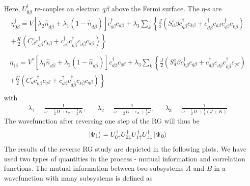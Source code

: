 \documentclass[twoside,11pt]{report}
\numberwithin{equation}{section}
\begin{document}
Here, \(U^\dagger_{0\beta}\) re-couples an electron \(q\beta\) above the Fermi surface. The \(\eta\)-s are
\begin{equation}\begin{aligned}
	\eta_{0\beta}^\dagger = V \left[\lambda_2 \hat n_{d\overline\beta} + \lambda_1 \left( 1 - \hat n_{d\overline\beta} \right)  \right]c^\dagger_{q\beta}c_{d\beta} + \lambda_3 \sum_{k} \left\{ \frac{J}{2}\left( S_d^z \beta c^\dagger_{q\beta}c_{k\beta} + c^\dagger_{d\overline\beta}c_{d\beta}c^\dagger_{q\beta}c_{k\overline\beta}\right) \right.\\
	+ \left.\frac{K}{2}\left( C^z_d c^\dagger_{q\beta}c_{k\beta} + c^\dagger_{q\beta}c^\dagger_{k\overline\beta}c_{d\overline\beta}c_{d\beta} \right) \right\} \\
\end{aligned}\end{equation}
\begin{equation}\begin{aligned}
	\eta_{1\beta} = V^* \left[\lambda_1 \hat n_{d\overline\beta} + \lambda_2 \left( 1 - \hat n_{d\overline\beta} \right)  \right]c^\dagger_{d\beta}c_{q\beta} + \lambda_3 \sum_{k} \left\{ \frac{J}{2}\left( S_d^z \beta c^\dagger_{k\beta}c_{q\beta} + c^\dagger_{d\beta}c_{d\overline\beta}c^\dagger_{k\overline\beta}c_{q\beta}\right) \right.\\
	+ \left.\frac{K}{2}\left( C^z_d c^\dagger_{k\beta}c_{q\beta} + c^\dagger_{d\beta}c^\dagger_{d\overline\beta}c_{k\overline\beta}c_{q\beta} \right) \right\} \\
\end{aligned}\end{equation}
with
\begin{equation}\begin{aligned}
	\lambda_1 = \frac{1}{\omega - \frac{1}{2}D + \epsilon_d + \frac{1}{2}K}, && \lambda_2 = \frac{1}{\omega - \frac{1}{2}D - \epsilon_d + \frac{1}{2}J}, && \lambda_3 = \frac{1}{\omega - \frac{1}{2}D + \frac{1}{4}\left(J + K\right)} 
\end{aligned}\end{equation}
The wavefunction after reversing one step of the RG will thus be
\begin{equation}\begin{aligned}
	\ket{\Psi_1} = U^\dagger_{0 \uparrow}U^\dagger_{0 \downarrow}U^\dagger_{1 \uparrow}U^\dagger_{1 \downarrow}\ket{\Psi_0}
\end{aligned}\end{equation}
The results of the reverse RG study are depicted in the following plots. We have used two types of quantities in the process - mutual information and correlation functions. The mutual information between two subsystems \(A\) and \(B\) in a wavefunction with many subsystems is defined as
\end{document}
